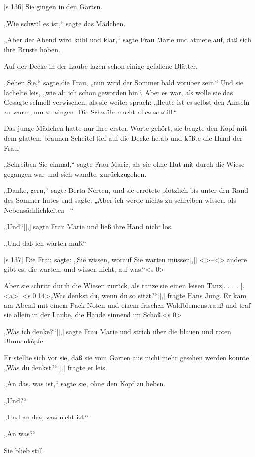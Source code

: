 [s 136]
Sie gingen in den Garten.

„Wie schwül es ist,“ sagte das Mädchen.

„Aber der Abend wird kühl und klar,“ sagte
Frau Marie und atmete auf, daß sich ihre Brüste hoben.

Auf der Decke in der Laube lagen schon einige
gefallene Blätter.

„Sehen Sie,“ sagte die Frau, „nun wird der
Sommer bald vorüber sein.“ Und sie lächelte leis,
„wie alt ich schon geworden bin“. Aber es war,
als wolle sie das Gesagte schnell verwischen, als sie
weiter sprach: „Heute ist es selbst den Amseln zu
warm, um zu singen. Die Schwüle macht alles so still.“

Das junge Mädchen hatte nur ihre ersten Worte
gehört, sie beugte den Kopf mit dem glatten, braunen
Scheitel tief auf die Decke herab und küßte die Hand
der Frau.

„Schreiben Sie einmal,“ sagte Frau Marie, als
sie ohne Hut mit durch die Wiese gegangen war
und sich wandte, zurückzugehen.

„Danke, gern,“ sagte Berta Norten, und sie
errötete plötzlich bis unter den Rand des Sommer­
hutes und sagte: „Aber ich werde nichts zu schreiben
wissen, als Nebensächlichkeiten –“

„Und“[|,] sagte Frau Marie und ließ ihre Hand
nicht los.

„Und daß ich warten muß.“

[s 137]
Die Frau sagte: „Sie wissen, worauf Sie warten
müs­sen[,|] <>–<> an­dere gibt es, die warten, und wissen
nicht, auf was.“<s 0>

Aber sie schritt durch die Wiesen zurück, als
tanze sie einen leisen Tanz[. . . .
|.
<a>]
<s 0.14>„Was denkst du, wenn du so sitzt?“[|,] fragte
Hans Jung. Er kam am Abend mit einem Pack Noten
und einem frischen Waldblumenstrauß und traf sie
allein in der Laube, die Hände sinnend im Schoß.<s 0>

„Was ich denke?“[|,] sagte Frau Marie und strich
über die blauen und roten Blumenköpfe.

Er stellte sich vor sie, daß sie vom Garten aus
nicht mehr gesehen werden konnte. „Was du denkst?“[|,]
fragte er leis.

„An das, was ist,“ sagte sie, ohne den Kopf
zu heben.

„Und?“

„Und an das, was nicht ist.“

„An was?“

Sie blieb still.

